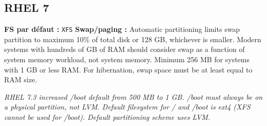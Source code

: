 \documentclass[10pt,a4paper]{article}
\begin{document}
\subsection{RHEL 7}
\noindent\small \textbf{FS par d\'efaut :} \texttt{XFS} \quad\textbullet\quad \textbf{Swap/paging :} Automatic partitioning limits swap partition to maximum 10\% of total disk or 128 GB, whichever is smaller. Modern systems with hundreds of GB of RAM should consider swap as a function of system memory workload, not system memory. Minimum 256 MB for systems with 1 GB or less RAM. For hibernation, swap space must be at least equal to RAM size.\normalsize\par\smallskip
\noindent\small\textit{RHEL 7.3 increased /boot default from 500 MB to 1 GB. /boot must always be on a physical partition, not LVM. Default filesystem for / and /boot is ext4 (XFS cannot be used for /boot). Default partitioning scheme uses LVM.}\normalsize\par\smallskip
\end{document}
